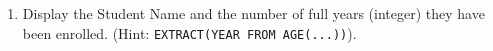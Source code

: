 \documentclass[12pt,a4paper]{article}
\begin{document}
\begin{enumerate}




\item Display the Student Name and the number of full years (integer) they have been enrolled. (Hint: \texttt{EXTRACT(YEAR FROM AGE(...))}).




\end{enumerate}
\end{document}

